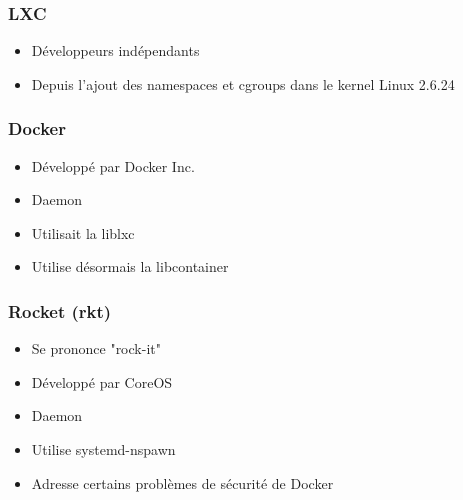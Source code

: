   \begin{frame}
     \frametitle{LXC}
    \begin{itemize}
      \item Développeurs indépendants
      \item Depuis l'ajout des namespaces et cgroups dans le kernel Linux 2.6.24
    \end{itemize}
  \end{frame}

 \begin{frame}
     \frametitle{Docker}
    \begin{itemize}
      \item Développé par Docker Inc.
      \item Daemon
      \item Utilisait la liblxc
      \item Utilise désormais la libcontainer
    \end{itemize}
  \end{frame}

   \begin{frame}
     \frametitle{Rocket (rkt)}
    \begin{itemize}
      \item Se prononce "rock-it"
      \item Développé par CoreOS
      \item Daemon
      \item Utilise systemd-nspawn
      \item Adresse certains problèmes de sécurité de Docker
    \end{itemize}
  \end{frame}

